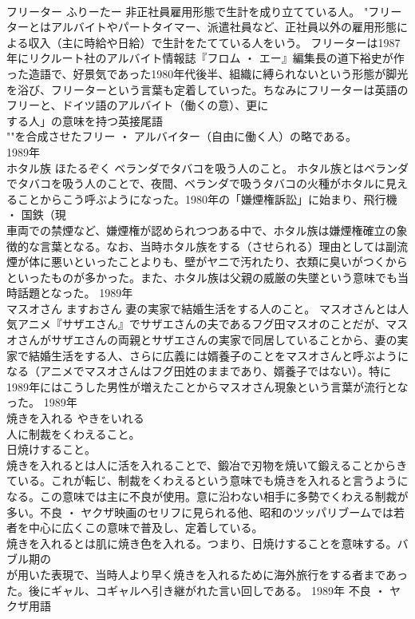 \documentclass[8pt]{extreport}
\begin{document}
\begin{CJK}{UTF8}{min}
\\	フリーター	ふりーたー	非正社員雇用形態で生計を成り立てている人。	"フリーターとはアルバイトやパートタイマー、派遣社員など、正社員以外の雇用形態による収入（主に時給や日給）で生計をたてている人をいう。 フリーターは1987年にリクルート社のアルバイト情報誌『フロム ・ エー』編集長の道下裕史が作った造語で、好景気であった1980年代後半、組織に縛られないという形態が脚光を浴び、フリーターという言葉も定着していった。ちなみにフリーターは英語のフリーと、ドイツ語のアルバイト（働くの意）、更に
\\	する人」の意味を持つ英接尾語
\\	""を合成させたフリー ・ アルバイター（自由に働く人）の略である。
\\	1989年	
\\	ホタル族	ほたるぞく	ベランダでタバコを吸う人のこと。	ホタル族とはベランダでタバコを吸う人のことで、夜間、ベランダで吸うタバコの火種がホタルに見えることからこう呼ぶようになった。1980年の「嫌煙権訴訟」に始まり、飛行機 ・ 国鉄（現
\\	車両での禁煙など、嫌煙権が認められつつある中で、ホタル族は嫌煙権確立の象徴的な言葉となる。なお、当時ホタル族をする（させられる）理由としては副流煙が体に悪いといったことよりも、壁がヤニで汚れたり、衣類に臭いがつくからといったものが多かった。また、ホタル族は父親の威厳の失墜という意味でも当時話題となった。	1989年	
\\	マスオさん	ますおさん	妻の実家で結婚生活をする人のこと。	マスオさんとは人気アニメ『サザエさん』でサザエさんの夫であるフグ田マスオのことだが、マスオさんがサザエさんの両親とサザエさんの実家で同居していることから、妻の実家で結婚生活をする人、さらに広義には婿養子のことをマスオさんと呼ぶようになる（アニメでマスオさんはフグ田姓のままであり、婿養子ではない）。特に1989年にはこうした男性が増えたことからマスオさん現象という言葉が流行となった。	1989年	
\\	焼きを入れる	やきをいれる	
\\	人に制裁をくわえること。 
\\	日焼けすること。	
\\	焼きを入れるとは人に活を入れることで、鍛冶で刃物を焼いて鍛えることからきている。これが転じ、制裁をくわえるという意味でも焼きを入れると言うようになる。この意味では主に不良が使用。意に沿わない相手に多勢でくわえる制裁が多い。不良 ・ ヤクザ映画のセリフに見られる他、昭和のツッパリブームでは若者を中心に広くこの意味で普及し、定着している。 
\\	焼きを入れるとは肌に焼き色を入れる。つまり、日焼けすることを意味する。バブル期の
\\	が用いた表現で、当時人より早く焼きを入れるために海外旅行をする者まであった。後にギャル、コギャルへ引き継がれた言い回しである。	1989年	不良 ・ ヤクザ用語	

\end{CJK}
\end{document}
